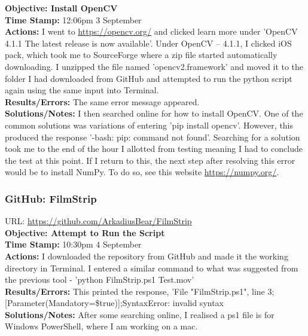 \documentclass{article}
\begin{document}
\textbf{Objective: Install OpenCV}\\
\textbf{Time Stamp:} 12:06pm 3 September\\
\textbf{Actions:} I went to \url{https://opencv.org/} and clicked learn more under 'OpenCV 4.1.1 The latest release is now available'. Under OpenCV – 4.1.1, I clicked iOS pack, which took me to SourceForge where a zip file started automatically downloading. I unzipped the file named 'opencv2.framework' and moved it to the folder I had downloaded from GitHub and attempted to run the python script again using the same input into Terminal. \\
\textbf{Results/Errors:} The same error message appeared.\\
\textbf{Solutions/Notes:} I then searched online for how to install OpenCV. One of the common solutions was variations of entering 'pip install opencv'. However, this produced the response '-bash: pip: command not found'. Searching for a solution took me to the end of the hour I allotted from testing meaning I had to conclude the test at this point. If I return to this, the next step after resolving this error would be to install NumPy. To do so, see this website \url{https://numpy.org/}.\\

\subsubsection{GitHub: FilmStrip}
URL: \url{https://github.com/ArkadiusBear/FilmStrip}\\
\textbf{Objective: Attempt to Run the Script}\\
\textbf{Time Stamp:} 10:30pm 4 September\\
\textbf{Actions:} I downloaded the repository from GitHub and made it the working directory in Terminal. I entered a similar command to what was suggested from the previous tool - 'python FilmStrip.ps1 Test.mov'\\
\textbf{Results/Errors:} This printed the response, 'File "FilmStrip.ps1", line 3; [Parameter(Mandatory=\$true)];SyntaxError: invalid syntax\\
\textbf{Solutions/Notes:} After some searching online, I realised a ps1 file is for Windows PowerShell, where I am working on a mac.\\
\end{document}

